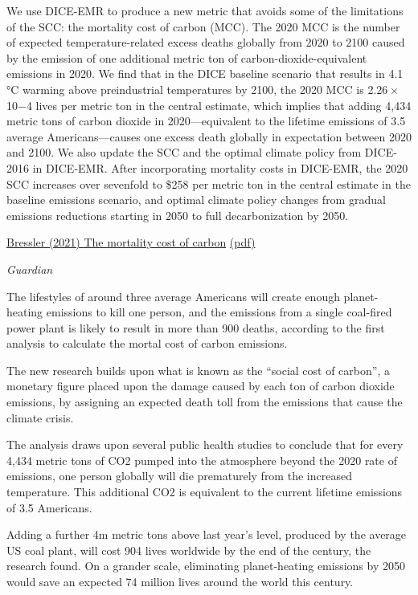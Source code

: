 \documentclass[
]{book}
\begin{document}
We use DICE-EMR to produce a new metric that avoids some of the limitations of the SCC: the mortality cost of carbon (MCC). The 2020 MCC is the number of expected temperature-related excess deaths globally from 2020 to 2100 caused by the emission of one additional metric ton of carbon-dioxide-equivalent emissions in 2020. We find that in the DICE baseline scenario that results in 4.1 °C warming above preindustrial temperatures by 2100, the 2020 MCC is 2.26 × 10−4 lives per metric ton in the central estimate, which implies that adding 4,434 metric tons of carbon dioxide in 2020---equivalent to the lifetime emissions of 3.5 average Americans---causes one excess death globally in expectation between 2020 and 2100. We also update the SCC and the optimal climate policy from DICE-2016 in DICE-EMR. After incorporating mortality costs in DICE-EMR, the 2020 SCC increases over sevenfold to \$258 per metric ton in the central estimate in the baseline emissions scenario, and optimal climate policy changes from gradual emissions reductions starting in 2050 to full decarbonization by 2050.

\href{https://www.nature.com/articles/s41467-021-24487-w}{Bressler (2021) The mortality cost of carbon}
\href{pdf/Bressler_2021_Mortality_Costs_of_Carbon.pdf}{(pdf)}

\emph{Guardian}

The lifestyles of around three average Americans will create enough planet-heating emissions to kill one person, and the emissions from a single coal-fired power plant is likely to result in more than 900 deaths, according to the first analysis to calculate the mortal cost of carbon emissions.

The new research builds upon what is known as the ``social cost of carbon'', a monetary figure placed upon the damage caused by each ton of carbon dioxide emissions, by assigning an expected death toll from the emissions that cause the climate crisis.

The analysis draws upon several public health studies to conclude that for every 4,434 metric tons of CO2 pumped into the atmosphere beyond the 2020 rate of emissions, one person globally will die prematurely from the increased temperature. This additional CO2 is equivalent to the current lifetime emissions of 3.5 Americans.

Adding a further 4m metric tons above last year's level, produced by the average US coal plant, will cost 904 lives worldwide by the end of the century, the research found. On a grander scale, eliminating planet-heating emissions by 2050 would save an expected 74 million lives around the world this century.
\end{document}
